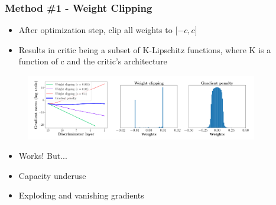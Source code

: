 \documentclass{Bredelebeamer}
\begin{document}
\begin{frame}
	\frametitle{Method \#1 - Weight Clipping}
	\begin{itemize}
		\item After optimization step, clip all weights to $ \big[{-c}, c \big] $
		\item Results in critic being a subset of K-Lipschitz functions, where K is a function of c and the critic's architecture
	\end{itemize}
	\begin{figure}[h!]
		\centering
		\includegraphics[width=0.9\textwidth]{wgan_clipping_vs_norm.png}
	\end{figure}
	\begin{itemize}
		\item Works! But...
		\item Capacity underuse
		\item Exploding and vanishing gradients
	\end{itemize}
\end{frame}
\end{document}
